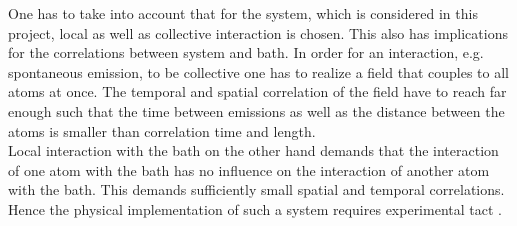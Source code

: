 One has to take into account that for the system, which is considered in this project, local as well as collective interaction is chosen. This also has implications for the correlations between system and bath.
In order for an interaction, e.g. spontaneous emission, to be collective one has to realize a field that couples to all atoms at once. The temporal and spatial correlation of the field have to reach far enough such that the time between emissions as well as the distance between the atoms is smaller than correlation time and length. \\Local interaction with the bath on the other hand demands that the interaction of one atom with the bath has no influence on the interaction of another atom with the bath. This demands sufficiently small spatial and temporal correlations. Hence the physical implementation of such a system requires experimental tact \cite{diehl_quantum_2008,shaw_multi-ensemble_2024}.\\\\%
